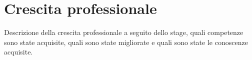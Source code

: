 \section{Crescita professionale}
\label{sez:crescita-professionale}

Descrizione della crescita professionale a seguito dello stage, quali competenze sono state acquisite, quali sono state migliorate e quali sono state le conoscenze acquisite.\\